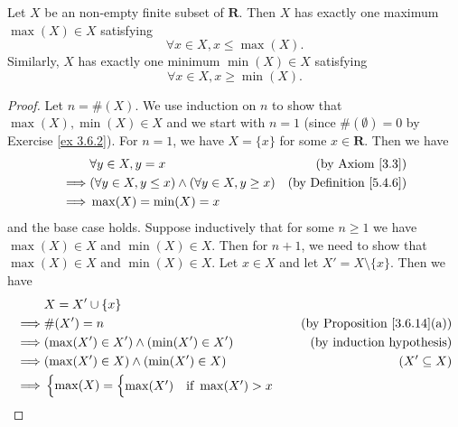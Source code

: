\begin{additional corollary}\label{ac 5.4.1}
Let \(X\) be an non-empty finite subset of \(\mathbf{R}\).
Then \(X\) has exactly one maximum \(\max(X) \in X\) satisfying
\[
    \forall x \in X, x \leq \max(X).
\]
Similarly, \(X\) has exactly one minimum \(\min(X) \in X\) satisfying
\[
    \forall x \in X, x \geq \min(X).
\]
\end{additional corollary}

\begin{proof}
    Let \(n = \#(X)\).
    We use induction on \(n\) to show that \(\max(X), \min(X) \in X\) and we start with \(n = 1\) (since \(\#(\emptyset) = 0\) by Exercise \ref{ex 3.6.2}).
    For \(n = 1\), we have \(X = \{x\}\) for some \(x \in \mathbf{R}\).
    Then we have
    \begin{align*}
                 & \forall y \in X, y = x                                        & \text{(by Axiom \ref{3.3})}        \\
        \implies & (\forall y \in X, y \leq x) \land (\forall y \in X, y \geq x) & \text{(by Definition \ref{5.4.6})} \\
        \implies & \max(X) = \min(X) = x
    \end{align*}
    and the base case holds.
    Suppose inductively that for some \(n \geq 1\) we have \(\max(X) \in X\) and \(\min(X) \in X\).
    Then for \(n + 1\), we need to show that \(\max(X) \in X\) and \(\min(X) \in X\).
    Let \(x \in X\) and let \(X' = X \setminus \{x\}\).
    Then we have
    \begin{align*}
                 & X = X' \cup \{x\}                                                                                                                   \\
        \implies & \#(X') = n                                                                                & \text{(by Proposition \ref{3.6.14}(a))} \\
        \implies & (\max(X') \in X') \land (\min(X') \in X')                                                 & \text{(by induction hypothesis)}        \\
        \implies & (\max(X') \in X) \land (\min(X') \in X)                                                   & (X' \subseteq X)                        \\
        \implies & \begin{cases}
                       \max(X) = \begin{cases}
                          \max(X') & \text{if } \max(X') > x \\

\end{cases}
\end{cases}
\end{align*}
\end{proof}
